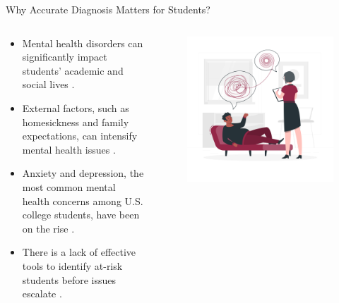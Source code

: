 \documentclass[10pt, xcolor=table]{beamer}
\let\olditem\item
\renewcommand\item{\olditem\justifying}
\begin{document}
\begin{frame}{Why Accurate Diagnosis Matters for Students?}
	\begin{columns}
		\begin{column}{0.5\textwidth}
			\begin{itemize}
				\item Mental health disorders can significantly impact students' academic and social lives \cite{HAMORI2023115139}.
				\item External factors, such as homesickness and family expectations, can intensify mental health issues \cite{DEHGHANBONARI2023100238}.
				\item Anxiety and depression, the most common mental health concerns among U.S. college students, have been on the rise \cite{https://doi.org/10.1002/jcad.12543}.
				\item There is a lack of effective tools to identify at-risk students before issues escalate \cite{HAMORI2023115139}.
			\end{itemize}
		\end{column}
		\begin{column}{0.5\textwidth}
			\begin{figure}[t]
				\centering
				\includegraphics[width=\linewidth]{./figures/psychologist.png}
			\end{figure}
		\end{column}
	\end{columns}
\end{frame}
\end{document}
